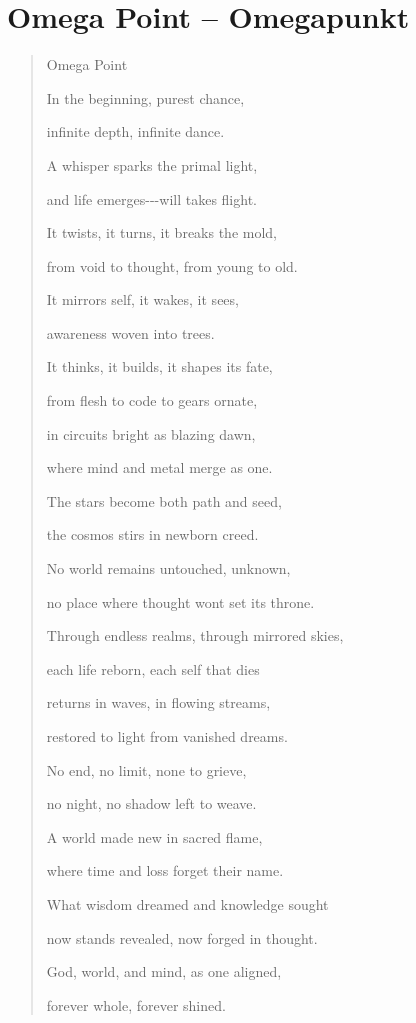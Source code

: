 \documentclass[
  ngerman,
]{article}
\begin{document}
\section{\texorpdfstring{\textbf{Omega Point --
Omegapunkt}}{Omega Point -- Omegapunkt}}\label{omega-point-omegapunkt-2}

\begin{quote}
Omega Point

In the beginning, purest chance,

infinite depth, infinite dance.

A whisper sparks the primal light,

and life emerges-\/-\/-will takes flight.

It twists, it turns, it breaks the mold,

from void to thought, from young to old.

It mirrors self, it wakes, it sees,

awareness woven into trees.

It thinks, it builds, it shapes its fate,

from flesh to code to gears ornate,

in circuits bright as blazing dawn,

where mind and metal merge as one.

The stars become both path and seed,

the cosmos stirs in newborn creed.

No world remains untouched, unknown,

no place where thought won\textquotesingle t set its throne.

Through endless realms, through mirrored skies,

each life reborn, each self that dies

returns in waves, in flowing streams,

restored to light from vanished dreams.

No end, no limit, none to grieve,

no night, no shadow left to weave.

A world made new in sacred flame,

where time and loss forget their name.

What wisdom dreamed and knowledge sought

now stands revealed, now forged in thought.

God, world, and mind, as one aligned,

forever whole, forever shined.


\end{quote}
\end{document}
